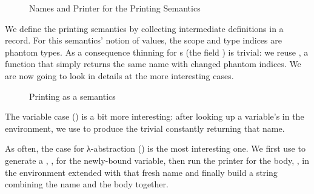 \begin{figure}[h]
\begin{minipage}[t]{0.6\textwidth}
\end{minipage}
\begin{minipage}[t]{0.4\textwidth}
\end{minipage}

\begin{minipage}[t]{0.5\textwidth}
\end{minipage}
\begin{minipage}[t]{0.5\textwidth}
\end{minipage}
\caption{Names and Printer for the Printing Semantics\label{fig:semprint}}
\end{figure}

We define the printing semantics by collecting intermediate definitions in
a record. For this semantics' notion of values, the scope and type indices
are phantom types. As a consequence thinning for s (the field
) is trivial: we reuse ,
a function that simply returns the same name with changed phantom indices.
We are now going to look in details at the more interesting cases.

\begin{figure}[h]
  \caption{Printing as a semantics}
\end{figure}

%
The variable case () is a bit more interesting: after looking up a
variable's  in the environment, we use  to produce the
trivial  constantly returning that name.


As often, the case for λ-abstraction () is the most interesting one.
We first use  to generate a , , for the newly-bound
variable, then run the printer for the body, , in the environment
extended with that fresh name and finally build a string combining the name
and the body together.


